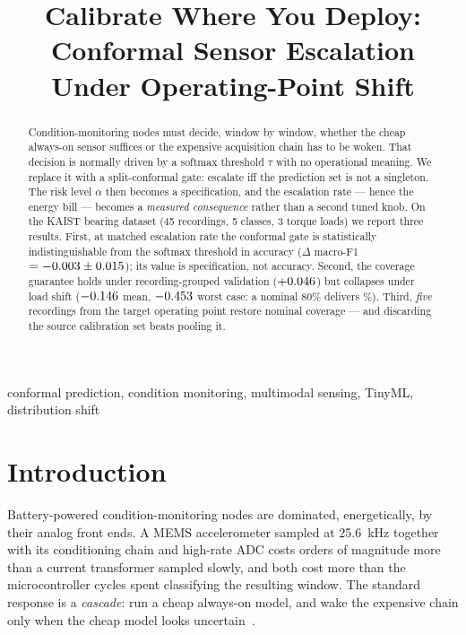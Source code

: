 \documentclass{article}
\title{Calibrate Where You Deploy: Conformal Sensor Escalation\\
       Under Operating-Point Shift}
\begin{document}
\ninept
\maketitle

\begin{abstract}
Condition-monitoring nodes must decide, window by window, whether the
cheap always-on sensor suffices or the expensive acquisition chain has to
be woken. That decision is normally driven by a softmax threshold
$\tau$ with no operational meaning. We replace it with a split-conformal
gate: escalate iff the prediction set is not a singleton. The risk level
$\alpha$ then becomes a specification, and the escalation rate --- hence
the energy bill --- becomes a \emph{measured consequence} rather than a
second tuned knob. On the KAIST bearing dataset (45 recordings, 5 classes,
3 torque loads) we report three results. First, at matched escalation rate
the conformal gate is statistically indistinguishable from the softmax
threshold in accuracy ($\Delta$ macro-F1 $= -0.003 \pm 0.015$); its value is
specification, not accuracy. Second, the coverage guarantee holds under
recording-grouped validation ($+0.046$) but collapses under load
shift ($-0.146$ mean, $-0.453$ worst case: a nominal 80\% delivers
\covEighty\%). Third, \emph{five} recordings from the target operating
point restore nominal coverage --- and discarding the source calibration
set beats pooling it.
\end{abstract}

\begin{IEEEkeywords}
conformal prediction, condition monitoring, multimodal sensing, TinyML,
distribution shift
\end{IEEEkeywords}

\section{Introduction}

Battery-powered condition-monitoring nodes are dominated, energetically, by
their analog front ends. A MEMS accelerometer sampled at
\SI{25.6}{\kilo\hertz} together with its conditioning chain and
high-rate ADC costs orders of magnitude more than a current transformer
sampled slowly, and both cost more than the microcontroller cycles spent
classifying the resulting window. The standard response is a
\emph{cascade}: run a cheap always-on model, and wake the expensive chain
only when the cheap model looks uncertain~\cite{TODOcascade}.
\end{document}
